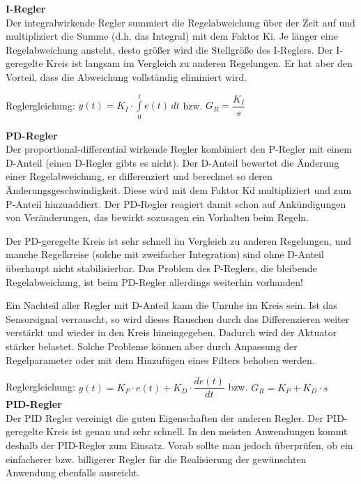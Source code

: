 \textbf{I-Regler}\\[1mm]
Der integralwirkende Regler summiert die Regelabweichung über der Zeit auf und multipliziert die Summe (d.h. das Integral) mit dem Faktor Ki. Je länger eine Regelabweichung ansteht, desto größer wird die Stellgröße des I-Reglers. Der I-geregelte Kreis ist langsam im Vergleich zu anderen Regelungen. Er hat aber den Vorteil, dass die Abweichung vollständig eliminiert wird.

Reglergleichung: \hspace{5mm} $y(t) = K_I \cdot \int\limits_{0}^{t} e(t) \,dt$ \hspace{5mm} bzw. \hspace{5mm} $G_R = \dfrac{K_I}{s}$

\newpage

\textbf{PD-Regler}\\[1mm]
Der proportional-differential wirkende Regler kombiniert den P-Regler mit einem D-Anteil (einen D-Regler gibts es nicht). Der D-Anteil bewertet die Änderung einer Regelabweichung, er differenziert und berechnet so deren Änderungsgeschwindigkeit. Diese wird mit dem Faktor Kd multipliziert und zum P-Anteil hinzuaddiert. Der PD-Regler reagiert damit schon auf Ankündigungen von Veränderungen, das bewirkt sozusagen ein Vorhalten beim Regeln.

Der PD-geregelte Kreis ist sehr schnell im Vergleich zu anderen Regelungen, und manche Regelkreise (solche mit zweifacher Integration) sind ohne D-Anteil überhaupt nicht stabilisierbar. Das Problem des P-Reglers, die bleibende Regelabweichung, ist beim PD-Regler allerdings weiterhin vorhanden!

Ein Nachteil aller Regler mit D-Anteil kann die Unruhe im Kreis sein. Ist das Sensorsignal verrauscht, so wird dieses Rauschen durch das Differenzieren weiter verstärkt und wieder in den Kreis hineingegeben. Dadurch wird der Aktuator stärker belastet. Solche Probleme können aber durch Anpassung der Regelparameter oder mit dem Hinzufügen eines Filters behoben werden.

Reglergleichung: \hspace{5mm} $y(t) = K_P \cdot e(t) + K_D \cdot \dfrac{de(t)}{dt}$\hspace{5mm} bzw. \hspace{5mm} $G_R = K_P + K_D \cdot s$
\\[5mm]

\textbf{PID-Regler}\\[1mm]
Der PID Regler vereinigt die guten Eigenschaften der anderen Regler. Der PID-geregelte Kreis ist genau und sehr schnell. In den meisten Anwendungen kommt deshalb der PID-Regler zum Einsatz. Vorab sollte man jedoch überprüfen, ob ein einfacherer bzw. billigerer Regler für die Realisierung der gewünschten Anwendung ebenfalls ausreicht. 

